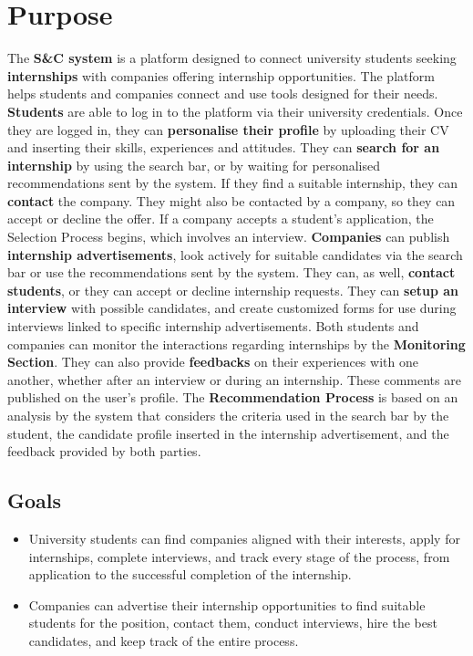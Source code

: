 \section{Purpose}
The \textbf{S\&C system} is a platform designed to connect university students seeking \textbf{internships} with companies offering internship opportunities. The platform helps students and companies connect and use tools designed for their needs.\newline
\textbf{Students} are able to log in to the platform via their university credentials. Once they are logged in, they can \textbf{personalise their profile} by uploading their CV and inserting their skills, experiences and attitudes. They can \textbf{search for an internship} by using the search bar, or by waiting for personalised recommendations sent by the system. If they find a suitable internship, they can \textbf{contact} the company. They might also be contacted by a company, so they can accept or decline the offer. If a company accepts a student's application, the Selection Process begins, which involves an interview.\newline
\textbf{Companies} can publish \textbf{internship advertisements}, look actively for suitable candidates via the search bar or use the recommendations sent by the system. They can, as well, \textbf{contact students}, or they can accept or decline internship requests. They can \textbf{setup an interview} with possible candidates, and create customized forms for use during interviews linked to specific internship advertisements.\newline
Both students and companies can monitor the interactions regarding internships by the \textbf{Monitoring Section}. They can also provide \textbf{feedbacks} on their experiences with one another, whether after an interview or during an internship. These comments are published on the user’s profile.\newline
The \textbf{Recommendation Process} is based on an analysis by the system that considers the criteria used in the search bar by the student, the candidate profile inserted in the internship advertisement, and the feedback provided by both parties.
\subsection{Goals}
\begin{itemize}

    \item [\text{[G1]}] University students can find companies aligned with their interests, apply for internships, complete interviews, and track every stage of the process, from application to the successful completion of the internship.

    \item[\text{[G2]}] Companies can advertise their internship opportunities to find suitable students for the position, contact them, conduct interviews, hire the best candidates, and keep track of the entire process.

    
\end{itemize}

